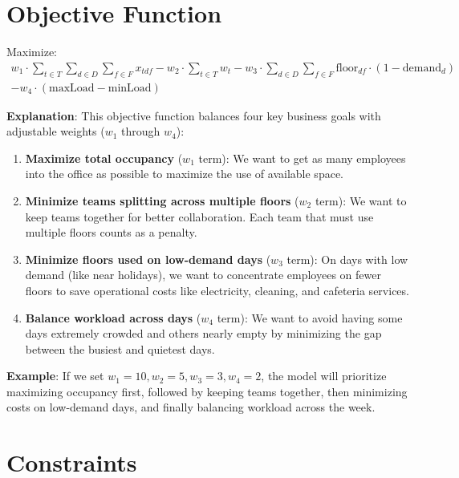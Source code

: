 \documentclass[12pt]{article}
\begin{document}
\section{Objective Function}
Maximize:
\begin{equation}
    \begin{split}
        w_1 \cdot \sum_{t \in T} \sum_{d \in D} \sum_{f \in F} x_{tdf} - w_2 \cdot \sum_{t \in T} w_t - w_3 \cdot \sum_{d \in D} \sum_{f \in F} \text{floor}_{df} \cdot (1 - \text{demand}_d)\\ - w_4 \cdot (\text{maxLoad} - \text{minLoad})
    \end{split}
\end{equation}

\textbf{Explanation}: This objective function balances four key business goals with adjustable weights ($w_1$ through $w_4$):

\begin{enumerate}
\item \textbf{Maximize total occupancy} ($w_1$ term): We want to get as many employees into the office as possible to maximize the use of available space.

\item \textbf{Minimize teams splitting across multiple floors} ($w_2$ term): We want to keep teams together for better collaboration. Each team that must use multiple floors counts as a penalty.

\item \textbf{Minimize floors used on low-demand days} ($w_3$ term): On days with low demand (like near holidays), we want to concentrate employees on fewer floors to save operational costs like electricity, cleaning, and cafeteria services.

\item \textbf{Balance workload across days} ($w_4$ term): We want to avoid having some days extremely crowded and others nearly empty by minimizing the gap between the busiest and quietest days.
\end{enumerate}

\textbf{Example}: If we set $w_1 = 10, w_2 = 5, w_3 = 3, w_4 = 2$, the model will prioritize maximizing occupancy first, followed by keeping teams together, then minimizing costs on low-demand days, and finally balancing workload across the week.

\section{Constraints}
\end{document}
